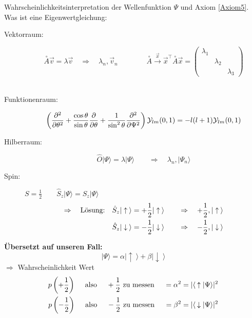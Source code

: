 Wahrscheinlichkeitsinterpretation der Wellenfunktion $ \Psi $ und Axiom \ref{Axiom5}.\\[5pt]
Was ist eine Eigenwertgleichung:\\
\begin{description}
	\item[Vektorraum:]
	$$ \overset{\circ}{A} \vec{v} = \lambda \vec{v} \quad \Rightarrow \quad \lambda_n, \vec{v}_n \qquad \qquad \overset{\circ}{A} \overset{\vec{x}}{\rightarrow} \vec{x}^\top \overset{\circ}{A} \vec{x} = \begin{pmatrix}
	\lambda_1 \\
	& \lambda_2 \\
	& & \lambda_3
	\end{pmatrix} $$
	\\[5pt]
	\item[Funktionenraum:]
	$$ \left(\frac{\partial ^2}{\partial \theta^2} + \frac{\cos \theta}{\sin \theta} \frac{\partial }{\partial \theta} + \frac{1}{\sin ^2 \theta} \frac{\partial ^2}{\partial \Psi^2} \right) \mathcal{Y}_{lm}(0,1) = - l ( l + 1 ) \mathcal{Y}_{lm}(0,1) $$
	\item[Hilberraum:]
	$$ \hat{O} | \Psi \rangle = \lambda | \Psi \rangle \qquad \Rightarrow \quad \lambda_n, | \Psi_n \rangle $$
	\item[Spin:] $ S = \frac{1}{2} \qquad \hat{S}_z |\Psi \rangle = S_z |\Psi \rangle $
	\begin{align*}
	\Rightarrow \quad \textrm{Lösung:} \quad \hat{S}_z |\uparrow \: \rangle &= + \frac{1}{2} | \uparrow \: \rangle \qquad \Rightarrow \quad + \frac{1}{2}, | \uparrow \: \rangle\\
	\hat{S}_z | \downarrow \: \rangle &= - \frac{1}{2} | \downarrow \: \rangle \qquad \Rightarrow \quad - \frac{1}{2}, | \downarrow \: \rangle
	\end{align*}
\end{description}
\textbf{Übersetzt auf unseren Fall:}
\begin{equation*}
| \Psi \rangle = \alpha | \uparrow \: \rangle + \beta | \downarrow \: \rangle
\end{equation*}
$ \Rightarrow $ Wahrscheinlichkeit Wert
\begin{align*}
p\left(+\frac{1}{2}\right) \quad \textrm{ also } \quad + \frac{1}{2} \textrm{ zu messen } \quad = \alpha^2 = | \langle \: \uparrow | \Psi \rangle | ^2\\
p\left(-\frac{1}{2}\right) \quad \textrm{ also } \quad - \frac{1}{2} \textrm{ zu messen } \quad = \beta^2 = |\langle \: \downarrow | \Psi \rangle | ^2
\end{align*}
